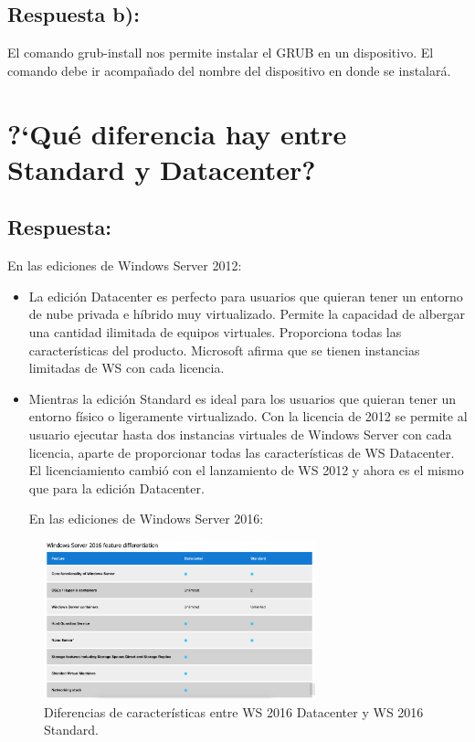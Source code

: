 \subsection{Respuesta b):}
El comando grub-install nos permite instalar el GRUB en un dispositivo. El comando debe ir acompañado del nombre del dispositivo en donde se instalará. \cite{cuestion8BB}
\section{?`Qué diferencia hay entre Standard y Datacenter?}
\subsection{Respuesta:}
En las ediciones de Windows Server 2012:\\

\begin{itemize}
	\item La edición Datacenter es perfecto para usuarios que quieran tener un entorno de nube privada e híbrido muy virtualizado. Permite la capacidad de albergar una cantidad ilimitada de equipos virtuales. Proporciona todas las características del producto. Microsoft afirma que se tienen instancias limitadas de WS con cada licencia. 
	\cite{MicrosoftDatacenterVSStandard}
	\item Mientras la edición Standard es ideal para los usuarios que quieran tener un entorno físico o ligeramente virtualizado. Con la licencia de 2012 se permite al usuario ejecutar hasta dos instancias virtuales de Windows Server con cada licencia, aparte de proporcionar todas las características de WS Datacenter. El licenciamiento cambió con el lanzamiento de WS 2012 y ahora es el mismo que para la edición Datacenter.\cite{MicrosoftDatacenterVSStandard}

En las ediciones de Windows Server 2016:
\end{itemize}
\begin{figure}[H]
	\begin{center}
		\includegraphics[width=0.7\textwidth]{Imagenes/Diferenciacion_WS2016}
		\caption{Diferencias de características entre WS 2016 Datacenter y WS 2016 Standard.\cite{WS2016DataStandard} } \label{fig:figura10} 
	\end{center}
\end{figure}

